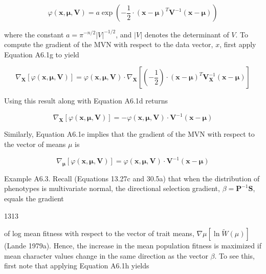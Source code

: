\documentclass{article}
\begin{document}
\begin{equation}
\varphi(\mathbf{x},\boldsymbol{\mu},\mathbf{V})=a\exp\left(-\frac{1}{2}\cdot(\mathbf{x}-\boldsymbol{\mu})^{T}\mathbf{V}^{-1}(\mathbf{x}-\boldsymbol{\mu})\right)
\end{equation}

where the constant  $ a = \pi^{-n/2} |V|^{-1/2} $, and  $ |V| $ denotes the determinant of  $ V $. To compute the gradient of the MVN with respect to the data vector,  $ x $, first apply Equation A6.1g to yield

\begin{equation}
\nabla_{\mathbf{X}}\left[\varphi(\mathbf{x},\boldsymbol{\mu},\mathbf{V})\right]=\varphi(\mathbf{x},\boldsymbol{\mu},\mathbf{V})\cdot\nabla_{\mathbf{X}}\left[\left(-\frac{1}{2}\right)\cdot(\mathbf{x}-\boldsymbol{\mu})^{T}\mathbf{V}_{\mathbf{X}}^{-1}\left(\mathbf{x}-\boldsymbol{\mu}\right)\right]
\end{equation}

Using this result along with Equation A6.1d returns

\begin{equation}
\nabla_{\mathbf{X}}\left[\varphi(\mathbf{x},\boldsymbol{\mu},\mathbf{V})\right]=-\varphi(\mathbf{x},\boldsymbol{\mu},\mathbf{V})\cdot\mathbf{V}^{-1}\left(\mathbf{x}-\boldsymbol{\mu}\right)
\end{equation}

Similarly, Equation A6.1e implies that the gradient of the MVN with respect to the vector of means  $ \mu $ is

\begin{equation}
\nabla_{\boldsymbol{\mu}}\left[\varphi(\mathbf{x},\boldsymbol{\mu},\mathbf{V})\right]=\varphi(\mathbf{x},\boldsymbol{\mu},\mathbf{V})\cdot\mathbf{V}^{-1}\left(\mathbf{x}-\boldsymbol{\mu}\right)
\end{equation}

Example A6.3. Recall (Equations 13.27c and 30.5a) that when the distribution of phenotypes is multivariate normal, the directional selection gradient,  $ \beta = \mathbf{P}^{-1}\mathbf{S} $, equals the gradient

1313

of log mean fitness with respect to the vector of trait means,  $ \nabla \mu[\ln \widetilde{W}(\mu)] $ (Lande 1979a). Hence, the increase in the mean population fitness is maximized if mean character values change in the same direction as the vector  $ \beta $. To see this, first note that applying Equation A6.1h yields
\end{document}
